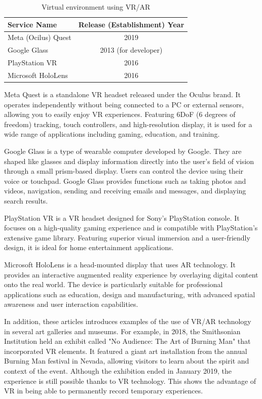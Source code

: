 \documentclass[12pt]{article}
\begin{document}
\begin{table}[h]
    \begin{center}
        \begin{tabular}{|l|c|} \hline
            Service Name        & Release (Establishment) Year \\ \hline
            Meta (Ocilus) Quest & 2019                         \\
            Google Glass        & 2013 (for developer)         \\
            PlayStation VR      & 2016                         \\
            Microsoft HoloLens  & 2016                         \\ \hline
        \end{tabular}
        \caption{Virtual environment using VR/AR}
    \end{center}
\end{table}

Meta Quest is a standalone VR headset released under the Oculus brand. It
operates independently without being connected to a PC or external sensors,
allowing you to easily enjoy VR experiences. Featuring 6DoF (6 degrees of
freedom) tracking, touch controllers, and high-resolution display, it is used
for a wide range of applications including gaming, education, and training.

Google Glass is a type of wearable computer developed by Google. They are
shaped like glasses and display information directly into the user's field of
vision through a small prism-based display. Users can control the device using
their voice or touchpad. Google Glass provides functions such as taking photos
and videos, navigation, sending and receiving emails and messages, and
displaying search results.

PlayStation VR is a VR headset designed for Sony's PlayStation console. It
focuses on a high-quality gaming experience and is compatible with
PlayStation's extensive game library. Featuring superior visual immersion and a
user-friendly design, it is ideal for home entertainment applications.

Microsoft HoloLens is a head-mounted display that uses AR technology. It
provides an interactive augmented reality experience by overlaying digital
content onto the real world. The device is particularly suitable for
professional applications such as education, design and manufacturing, with
advanced spatial awareness and user interaction capabilities.

In addition, these articles\cite{ref2}\cite{ref3} introduces examples of
the use
of VR/AR technology in several art galleries and museums. For example, in 2018,
the Smithsonian Institution held an exhibit called "No Audience: The Art of
Burning Man" that incorporated VR elements. It featured a giant art
installation from the annual Burning Man festival in Nevada, allowing visitors
to learn about the spirit and context of the event. Although the exhibition
ended in January 2019, the experience is still possible thanks to VR
technology. This shows the advantage of VR in being able to permanently record
temporary experiences.
\end{document}
